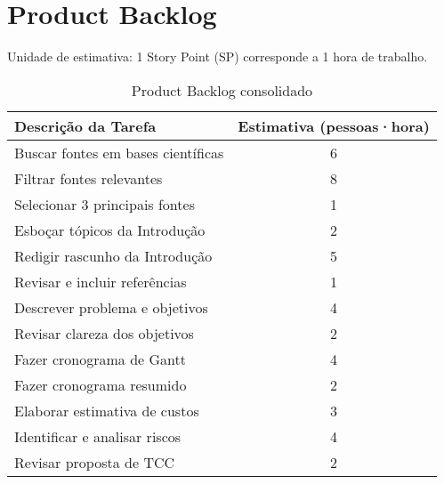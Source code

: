 \section{Product Backlog}

Unidade de estimativa: 1 Story Point (SP) corresponde a 1 hora de trabalho.

\begin{table}[htbp]
  \centering
  \caption{Product Backlog consolidado}
  \label{tab:productbacklog}
  \begin{tabular}{lc}
    \toprule
    Descrição da Tarefa & Estimativa (pessoas·hora) \\
    \midrule
    Buscar fontes em bases científicas & 6 \\
    Filtrar fontes relevantes & 8 \\
    Selecionar 3 principais fontes & 1 \\
    Esboçar tópicos da Introdução & 2 \\
    Redigir rascunho da Introdução & 5 \\
    Revisar e incluir referências & 1 \\
    Descrever problema e objetivos & 4 \\
    Revisar clareza dos objetivos & 2 \\
    Fazer cronograma de Gantt & 4 \\
    Fazer cronograma resumido & 2 \\
    Elaborar estimativa de custos & 3 \\
    Identificar e analisar riscos & 4 \\
    Revisar proposta de TCC & 2 \\
    \bottomrule
  \end{tabular}
\end{table}